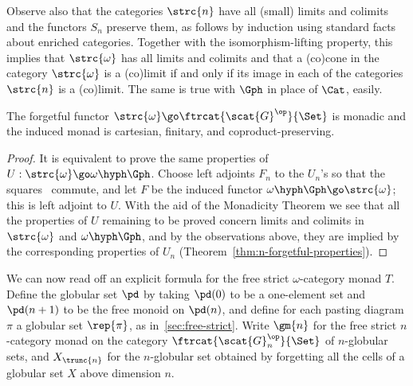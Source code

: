 Observe also that the categories $\strc{n}$ have all (small) limits and
colimits and the functors $S_n$ preserve them, as follows by induction
using standard facts about enriched categories.  Together with the
isomorphism-lifting property, this implies that $\strc{\omega}$ has all
limits and colimits and that a (co)cone in the category $\strc{\omega}$ is
a (co)limit if and only if its image in each of the categories $\strc{n}$
is a (co)limit.  The same is true with $\Gph$ in place of $\Cat$, easily.

\begin{thm}	
The forgetful functor $\strc{\omega} \go \ftrcat{\scat{G}^\op}{\Set}$ is
monadic and the induced monad is cartesian, finitary, and
coproduct-preserving.
\end{thm}
%
\begin{proof}
It is equivalent to prove the same properties of $U: \strc{\omega} \go
\omega\hyph\Gph$.  Choose left adjoints $F_n$ to the $U_n$'s so that the
squares~ commute, and let $F$ be the induced functor
$\omega\hyph\Gph \go \strc{\omega}$; this is left adjoint to $U$.  With the
aid of the Monadicity Theorem we see that all the properties of $U$
remaining to be proved concern limits and colimits in $\strc{\omega}$ and
$\omega\hyph\Gph$, and by the observations above, they are implied by the
corresponding properties of $U_n$
(Theorem~\ref{thm:n-forgetful-properties}).  \done
\end{proof}%
%
%

We can now read off an explicit formula for the free strict
$\omega$-category monad $T$.  Define the globular set $\pd$%
%
%
by taking
$\pd(0)$ to be a one-element set and $\pd(n+1)$ to be the free monoid on
$\pd(n)$, and define for each pasting diagram $\pi$ a globular set
$\rep{\pi}$, as in~\ref{sec:free-strict}.  Write $\gm{n}$ for the free
strict $n$-category monad on the category $\ftrcat{\scat{G}_n^\op}{\Set}$
of $n$-globular sets, and $X_{\trunc{n}}$%
% 
%
%
% 
for the $n$-globular set obtained
by forgetting all the cells of a globular set $X$ above dimension $n$.

